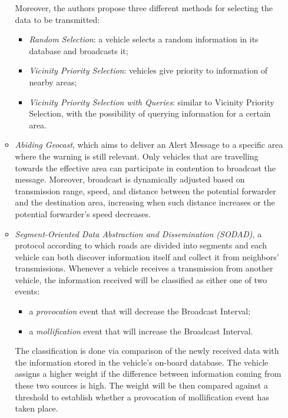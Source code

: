 \begin{enumerate}
\begin{itemize}
					Moreover, the authors propose three different methods for selecting the data to be transmitted:
					\begin{itemize}
						\item \textit{Random Selection}: a vehicle selects a random information in its database and broadcasts it;
						\item \textit{Vicinity Priority Selection}: vehicles give priority to information of nearby areas;
						\item \textit{Vicinity Priority Selection with Queries}: similar to Vicinity Priority Selection, with the possibility of querying information for a certain area.
					\end{itemize}
					
					\item \textit{Abiding Geocast}\cite{4531929}, which aims to deliver an Alert Message to a specific area where the warning is still relevant. Only vehicles that are travelling towards the effective area can participate in contention to broadcast the message. Moreover, broadcast is dynamically adjusted based on transmission range, speed, and distance between the potential forwarder and the destination area, increasing when such distance increases or the potential forwarder's speed decreases.
					
					\item \textit{Segment-Oriented Data Abstraction and Dissemination
						(SODAD)}\cite{1402433}, a protocol according to which roads are divided into segments and each vehicle can both discover information itself and collect it from neighbors' transmissions. Whenever a vehicle receives a transmission from another vehicle, the information received will be classified as either one of two events:
					\begin{itemize}
						\item a \textit{provocation} event that will decrease the Broadcast Interval;
						\item a \textit{mollification} event that will increase the Broadcast Interval.
					\end{itemize}
					The classification is done via comparison of the newly received data with the information stored in the vehicle's on-board database. The vehicle assigns a higher weight if the difference between information coming from these two sources is high. The weight will be then compared against a threshold to establish whether a provocation of mollification event has taken place.
				\end{itemize}
			\end{enumerate}
		
